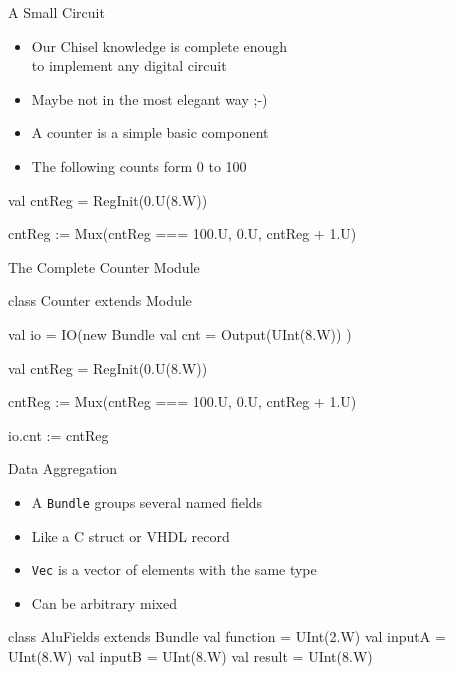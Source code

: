 \documentclass[xcolor=pdflatex,dvipsnames,table]{beamer}
\newcommand{\code}[1]{{\texttt{#1}}}
\begin{document}
\begin{frame}[fragile]{A Small Circuit}
\begin{itemize}
\item Our Chisel knowledge is complete enough\\ to implement any digital circuit
\item Maybe not in the most elegant way ;-)
\item A counter is a simple basic component
\item The following counts form 0 to 100
\end{itemize}
\begin{chisel}
  val cntReg = RegInit(0.U(8.W))

  cntReg := Mux(cntReg === 100.U,
    0.U, cntReg + 1.U)
\end{chisel}
\end{frame}

\begin{frame}[fragile]{The Complete Counter Module}
\begin{chisel}
class Counter extends Module {
  val io = IO(new Bundle {
    val cnt = Output(UInt(8.W))
  })

  val cntReg = RegInit(0.U(8.W))

  cntReg := Mux(cntReg === 100.U,
    0.U, cntReg + 1.U)

  io.cnt := cntReg
}
\end{chisel}
\end{frame}

\begin{frame}[fragile]{Data Aggregation}
\begin{itemize}
\item A \code{Bundle} groups several named fields
\item Like a C struct or VHDL record
\item \code{Vec} is a vector of elements with the same type
\item Can be arbitrary mixed
\end{itemize}
\begin{chisel}
class AluFields extends Bundle {
  val function = UInt(2.W)
  val inputA = UInt(8.W)
  val inputB = UInt(8.W)
  val result = UInt(8.W)
}
\end{chisel}
\end{frame}
\end{document}
